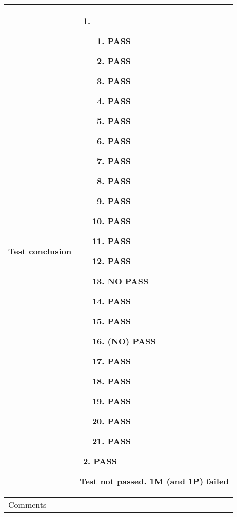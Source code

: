 \documentclass[10pt]{article}
\begin{document}
\begin{center}
\begin{longtable}{ | p{4cm} | p{10cm} | }
			Test conclusion & 	\begin{enumerate}
							\item
							\begin{enumerate}
								\item PASS
								\item PASS
								\item PASS
								\item PASS
								\item PASS
								\item PASS								
								\item PASS
								\item PASS
								\item PASS
								\item PASS
								\item PASS								
								\item PASS
								\item NO PASS
								\item PASS
								\item PASS
								\item (NO) PASS
								\item PASS
								\item PASS
								\item PASS
								\item PASS
								\item PASS
							\end{enumerate}
							\item PASS
						\end{enumerate}
						Test not passed. 1M (and 1P) failed \\ [3pt] \hline

			Comments & -
					\\ [3pt] \hline
\end{longtable}
\end{center}
\end{document}
